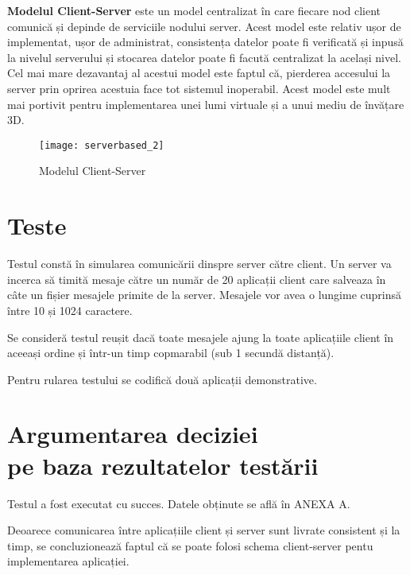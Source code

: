 \textbf{Modelul Client-Server} este un model centralizat în care fiecare nod client comunică și depinde de serviciile nodului server. Acest model este relativ ușor de implementat, ușor de administrat, consistența datelor poate fi verificată și inpusă la nivelul serverului și stocarea datelor poate fi facută centralizat la același nivel. Cel mai mare dezavantaj al acestui model este faptul că, pierderea accesului la server prin oprirea acestuia face tot sistemul inoperabil. Acest model este mult mai portivit pentru implementarea unei lumi virtuale și a unui mediu de învățare 3D. 

\begin{figure}[h]
    \centering
    \texttt{[image: serverbased\_2]}
    \caption{Modelul Client-Server}
    \label{fig:imag5}
\end{figure}

\section{Teste}
\par Testul constă în simularea comunicării dinspre server către client. Un server va incerca să timită mesaje către un număr de 20 aplicații client care salveaza în câte un fișier mesajele primite de la server. Mesajele vor avea o lungime cuprinsă între 10 și 1024 caractere.
\par Se consideră testul reușit dacă toate mesajele ajung la toate aplicațiile client în aceeași ordine și într-un timp copmarabil (sub 1 secundă distanță).
\par Pentru rularea testului se codifică două aplicații demonstrative.

\section{Argumentarea deciziei \\ pe baza rezultatelor testării}

\par Testul a fost executat cu succes. Datele obținute se află în ANEXA A.
\par Deoarece comunicarea între aplicațiile client și server sunt livrate consistent și la timp, se concluzionează faptul că se poate folosi schema client-server pentu implementarea aplicației.
